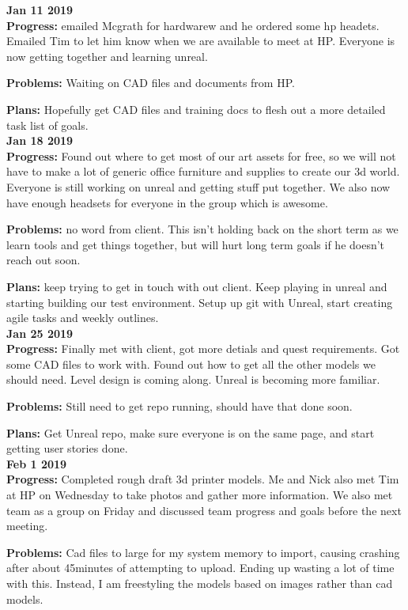 \textbf{Jan 11 2019}\\
\textbf{Progress:}
emailed Mcgrath for hardwarew and he ordered some hp headets. Emailed Tim to let him know when we are available to meet at HP. Everyone is now getting together and learning unreal.

\textbf{Problems:}
Waiting on CAD files and documents from HP.

\textbf{Plans:} 
Hopefully get CAD files and training docs to flesh out a more detailed task list of goals.\\

\textbf{Jan 18 2019}\\
\textbf{Progress:} 
Found out where to get most of our art assets for free, so we will not have to make a lot of generic office furniture and supplies to create our 3d world. Everyone is still working on unreal and getting stuff put together. We also now have enough headsets for everyone in the group which is awesome.

\textbf{Problems:}
no word from client. This isn't holding back on the short term as we learn tools and get things together, but will hurt long term goals if he doesn't reach out soon.

\textbf{Plans:}
keep trying to get in touch with out client. Keep playing in unreal and starting building our test environment. Setup up git with Unreal, start creating agile tasks and weekly outlines.\\

\textbf{Jan 25 2019}\\
\textbf{Progress:} 
Finally met with client, got more detials and quest requirements. Got some CAD files to work with. Found out how to get all the other models we should need. Level design is coming along. Unreal is becoming more familiar.

\textbf{Problems:} 
Still need to get repo running, should have that done soon.

\textbf{Plans:} 
Get Unreal repo, make sure everyone is on the same page, and start getting user stories done.\\

\textbf{Feb 1 2019}\\

\textbf{Progress:}
Completed rough draft 3d printer models. Me and Nick also met Tim at HP on Wednesday to take photos and gather more information. We also met team as a group on Friday and discussed team progress and goals before the next meeting.

\textbf{Problems:}
Cad files to large for my system memory to import, causing crashing after about 45minutes of attempting to upload. Ending up wasting a lot of time with this. Instead, I am freestyling the models based on images rather than cad models.


